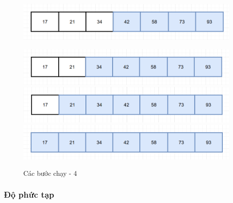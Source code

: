 \begin{figure}[H]
    \centering
    \includegraphics[width=1\linewidth]{img/bubble_sort/16.png}
    
    \vspace{0.5cm}
    \includegraphics[width=1\linewidth]{img/bubble_sort/17.png}
    \vspace{0.5cm}
    \includegraphics[width=1\linewidth]{img/bubble_sort/18.png}
    \vspace{0.5cm}
    \includegraphics[width=1\linewidth]{img/bubble_sort/19.png}
    \caption{Các bước chạy - 4}
    \label{fig:part4}
\end{figure}


\subsubsection{Độ phức tạp}